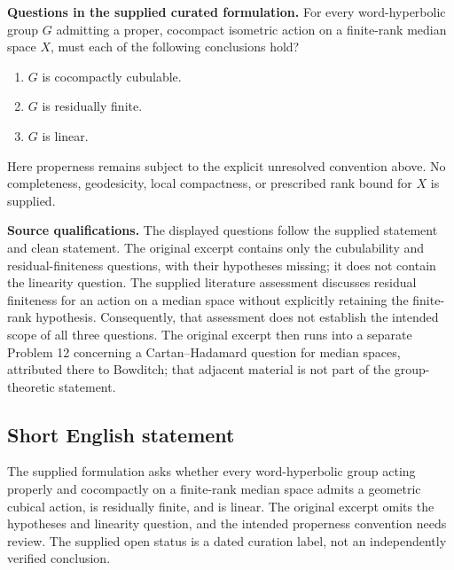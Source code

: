 \documentclass[11pt]{article}
\begin{document}
\textbf{Questions in the supplied curated formulation.} For every word-hyperbolic group $G$ admitting a proper, cocompact isometric action on a finite-rank median space $X$, must each of the following conclusions hold?
\begin{enumerate}
\item $G$ is cocompactly cubulable.
\item $G$ is residually finite.
\item $G$ is linear.
\end{enumerate}
Here properness remains subject to the explicit unresolved convention above. No completeness, geodesicity, local compactness, or prescribed rank bound for $X$ is supplied.

\textbf{Source qualifications.} The displayed questions follow the supplied statement and clean statement. The original excerpt contains only the cubulability and residual-finiteness questions, with their hypotheses missing; it does not contain the linearity question. The supplied literature assessment discusses residual finiteness for an action on a median space without explicitly retaining the finite-rank hypothesis. Consequently, that assessment does not establish the intended scope of all three questions. The original excerpt then runs into a separate Problem 12 concerning a Cartan--Hadamard question for median spaces, attributed there to Bowditch; that adjacent material is not part of the group-theoretic statement.
\subsection{Short English statement}
The supplied formulation asks whether every word-hyperbolic group acting properly and cocompactly on a finite-rank median space admits a geometric cubical action, is residually finite, and is linear. The original excerpt omits the hypotheses and linearity question, and the intended properness convention needs review. The supplied open status is a dated curation label, not an independently verified conclusion.
\end{document}
